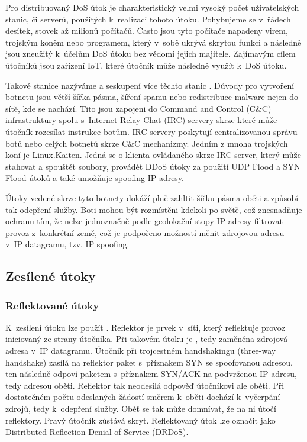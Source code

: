 Pro distribuovaný DoS útok je charakteristický velmi vysoký počet uživatelských stanic,
či serverů, použitých k~realizaci tohoto útoku. Pohybujeme se v~řádech desítek, stovek až
milionů počítačů. 
Často jsou tyto počítače napadeny virem, trojským koněm nebo programem, který v~sobě ukrývá
skrytou funkci a následně jsou zneužitý k~účelům DoS útoku bez vědomí jejich majitele.
Zajímavým cílem útočníků jsou zařízení IoT, které útočník může následně využít k~DoS
útoku.

Takové stanice nazýváme  a seskupení více těchto stanic . Důvody pro
vytvoření botnetu jsou větší šířka pásma, šíření spamu nebo redistribuce malware nejen do sítě,
kde se  nachází. Tito  jsou zapojeni do Command and Control (C\&C) infrastruktury spolu
s~Internet Relay Chat (IRC) servery skrze které může útočník rozesílat instrukce botům. %
IRC servery poskytují centralizovanou správu botů nebo celých botnetů skrze C\&C
mechanizmy. Jedním z mnoha trojských koní je Linux.Kaiten. Jedná se o klienta ovládaného skrze
IRC server, který může stahovat a spouštět soubory, provádět DDoS útoky za
použití UDP Flood a SYN Flood útoků a také umožňuje spoofing IP adresy.

Útoky vedené skrze tyto botnety dokáží plně zahltit šířku pásma oběti a způsobí tak odepření
služby. 
Boti mohou být rozmístěni kdekoli po světě, což znesnadňuje ochranu tím, že nelze
jednoznačně podle geolokační stopy IP adresy filtrovat provoz z~konkrétní země, což je
podpořeno možností měnit zdrojovou adresu v~IP datagramu, tzv. IP spoofing.


\subsection{Zesílené útoky}
\label{subsec:zesilene_utoky}
\subsubsection{Reflektované útoky}
\label{subsec:reflektovane_utoky}
K~zesílení útoku lze použít . Reflektor je prvek v~síti, který reflektuje provoz
iniciovaný ze strany útočníka. Při takovém útoku je , tedy zaměněna zdrojová adresa
v~IP datagramu. Útočník při trojcestném handshakingu (three-way handshake) zasílá na reflektor
paket s~příznakem SYN se spoofovanou adresou, ten následně odpoví paketem s~příznakem SYN/ACK
na podvrženou IP adresu, tedy adresou oběti. Reflektor tak neodesílá odpověď útočníkovi ale
oběti. Při dostatečném počtu odeslaných žádostí směrem k~oběti dochází k~vyčerpání zdrojů, tedy
k~odepření služby. Oběť se tak může domnívat, že na ni útočí reflektory. Pravý útočník zůstává
skryt. Reflektovaný útok lze označit jako Distributed Reflection Denial of Service (DRDoS).

